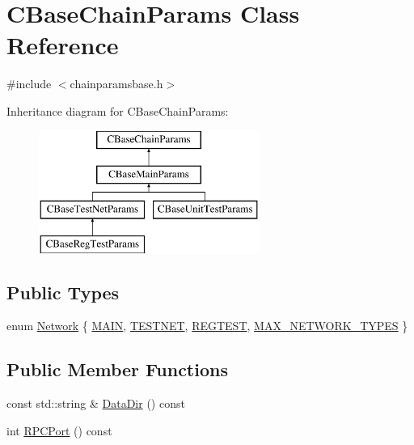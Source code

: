 \hypertarget{class_c_base_chain_params}{}\section{C\+Base\+Chain\+Params Class Reference}
\label{class_c_base_chain_params}


{\ttfamily \#include $<$chainparamsbase.\+h$>$}

Inheritance diagram for C\+Base\+Chain\+Params\+:\begin{figure}[H]
\begin{center}
\leavevmode
\includegraphics[height=4.000000cm]{class_c_base_chain_params}
\end{center}
\end{figure}
\subsection*{Public Types}
\begin{DoxyCompactItemize}
\item 
enum \mbox{\hyperlink{class_c_base_chain_params_a19fb46b499c21801c0ff3c8607a0994e}{Network}} \{ \mbox{\hyperlink{class_c_base_chain_params_a19fb46b499c21801c0ff3c8607a0994ea17aedaa2a3181d12f0d32afc70a6c68c}{M\+A\+IN}}, 
\mbox{\hyperlink{class_c_base_chain_params_a19fb46b499c21801c0ff3c8607a0994ea0a9c4e42da932cdd126777f7f4dd0e22}{T\+E\+S\+T\+N\+ET}}, 
\mbox{\hyperlink{class_c_base_chain_params_a19fb46b499c21801c0ff3c8607a0994eace36282edb786b098dbdd48f98ddb793}{R\+E\+G\+T\+E\+ST}}, 
\mbox{\hyperlink{class_c_base_chain_params_a19fb46b499c21801c0ff3c8607a0994eaf4a96679adc48f01c489d1b4d740deb5}{M\+A\+X\+\_\+\+N\+E\+T\+W\+O\+R\+K\+\_\+\+T\+Y\+P\+ES}}
 \}
\end{DoxyCompactItemize}
\subsection*{Public Member Functions}
\begin{DoxyCompactItemize}
\item 
const std\+::string \& \mbox{\hyperlink{class_c_base_chain_params_a4b142e94ae27f860522dd5efef41fb67}{Data\+Dir}} () const
\item 
int \mbox{\hyperlink{class_c_base_chain_params_a790801bda78d70db56da89ca43934a63}{R\+P\+C\+Port}} () const
\end{DoxyCompactItemize}
